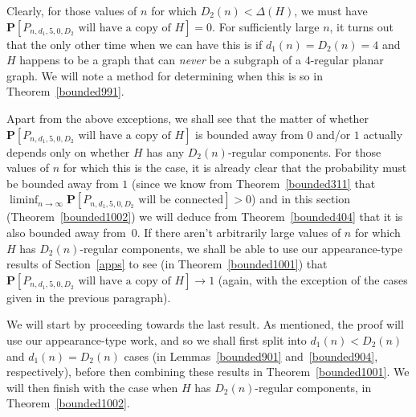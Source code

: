\documentclass{article}
\newtheorem{Proof of Theorem}{Proof of Theorem}
\begin{document}
Clearly, for those values of $n$ for which $D_{2}(n) < \Delta(H)$,
we must have $\mathbf{P}[P_{n,d_{1},5,0,D_{2}} \textrm{ will have a copy of } H] =0$.
For sufficiently large $n$,
it turns out that the only other time when we can have this
is if $d_{1}(n)=D_{2}(n)=4$ 
and $H$ happens to be a graph that can \textit{never} be a subgraph of a $4$-regular planar graph.
We will note a method for determining when this is so in Theorem~\ref{bounded991}.

Apart from the above exceptions,
we shall see that the matter of whether
$\mathbf{P}[P_{n,d_{1},5,0,D_{2}} \textrm{ will have a copy of } H]$
is bounded away from $0$ and/or $1$
actually depends only on whether $H$ has any $D_{2}(n)$-regular components.
For those values of $n$ for which this is the case,
it is already clear that the probability must be bounded away from $1$
(since we know from Theorem~\ref{bounded311} that
$\liminf_{n \to \infty} \mathbf{P}[P_{n,d_{1},5,0,D_{2}} \textrm{ will be connected}] >0$)
and in this section (Theorem~\ref{bounded1002})
we will deduce from Theorem~\ref{bounded404} that it is also bounded away from~$0$.
If there aren't arbitrarily large values of $n$ for which $H$ has $D_{2}(n)$-regular components,
we shall be able to use our appearance-type results of Section~\ref{apps} 
to see (in Theorem~\ref{bounded1001}) that 
$\mathbf{P}[P_{n,d_{1},5,0,D_{2}} \textrm{ will have a copy of } H] \to 1$
(again, with the exception of the cases given in the previous paragraph).

We will start by proceeding towards the
last result.
As mentioned,
the proof will use our appearance-type work,
and so we shall first split into $d_{1}(n) < D_{2}(n)$ and $d_{1}(n)=D_{2}(n)$ cases
(in Lemmas~\ref{bounded901} and~\ref{bounded904}, respectively),
before then combining these results in Theorem~\ref{bounded1001}.
We will then finish with the case when $H$ has $D_{2}(n)$-regular components,
in Theorem~\ref{bounded1002}. 





\begin{figure}[omitted: a diagram of this paper's results, not reproduced here]\end{figure}
\end{document}

